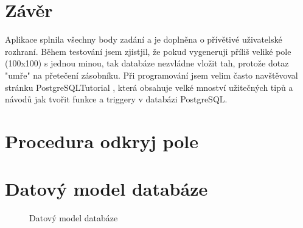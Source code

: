 \documentclass{article}
\begin{document}
\section{Závěr}
Aplikace splnila všechny body zadání a je doplněna o přívětivé uživatelské rozhraní.
Během testování jsem zjistjil, že pokud vygeneruji příliš veliké pole (100x100) s jednou
minou, tak databáze nezvládne vložit tah, protože dotaz "umře" na přetečení zásobníku.
Při programování jsem velim často navštěvoval stránku PostgreSQLTutorial \cite{postgres},
která obsahuje velké mnoství užitečných tipů a návodů jak tvořit funkce a triggery v
databázi PostgreSQL.

\medskip



\newpage

\begin{appendices}
\section{Procedura odkryj pole}


\newpage
\section{Datový model databáze}
\begin{figure}[!h]
\begin{center}
    \caption{Datový model databáze}
    \label{fig:era}
\end{center}
\end{figure}


\end{appendices}
\end{document}
